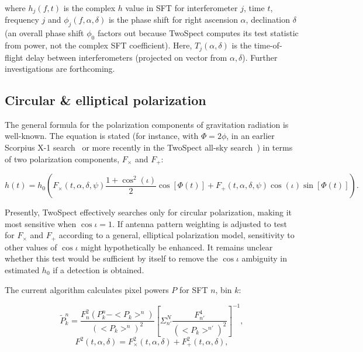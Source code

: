 \noindent where $h_{j}(f,t)$ is the complex $h$ value in SFT for interferometer $j$, time $t$, frequency $j$ and
$\phi_{j}(f,\alpha,\delta)$ is the phase shift for right ascension $\alpha$,
declination $\delta$ 
(an overall phase shift $\phi_{0}$ factors out because
TwoSpect computes its test statistic from power, not the complex SFT coefficient).
Here,
$T_{j}(\alpha,\delta)$ is the time-of-flight delay between interferometers 
(projected on vector from $\alpha,\delta$).
Further investigations are forthcoming.


\subsection{Circular \& elliptical polarization}



The general formula for the polarization components of gravitation radiation is well-known.
The equation is stated (for instance, with $\Phi=2\phi$, in an earlier Scorpius X-1 search~\cite{AbbottScoX12007} or more recently in the TwoSpect all-sky search~\cite{GoetzTwoSpectResults2014}) in terms of two polarization components, $F_\times$ and $F_+$:

\begin{equation}
h(t)=h_{0} \left(F_{\times}(t,\alpha,\delta,\psi)\frac{1+\cos^{2}(\iota)}{2}\cos[\Phi(t)]+
F_{+}(t,\alpha,\delta,\psi)\cos(\iota)\sin[\Phi(t)]\right).
\label{TwoSpect_pol_effect}
\end{equation}

Presently, TwoSpect effectively searches only for circular polarization, making it most sensitive when $\cos \iota = 1$.
If antenna pattern weighting is adjusted to test for $F_\times$ and $F_+$ according to a general, elliptical polarization model, sensitivity to other values of $\cos \iota$ might hypothetically be enhanced.
It remains unclear whether this test would be sufficient by itself to remove the $\cos \iota$ ambiguity in estimated $h_0$ if a detection is obtained.

The current algorithm calculates pixel powers $P$ for SFT $n$, bin $k$:

\begin{equation}
\tilde{P}_{k}^{n}=\frac{F_{n}^{2}(P_{k}^{n}-<P_{k}>^{n})}{(<P_{k}>^{n})^{2}}\left[\Sigma_{n'}^{N}\frac{F_{n'}^{4}}{(<P_{k}>^{n'})^{2}}\right]^{-1},
\label{TwoSpect_pixel_powers}
\end{equation}
\begin{equation}
F^{2}(t,\alpha,\delta)=F_{\times}^{2}(t,\alpha,\delta)+F_{+}^{2}(t,\alpha,\delta),
\label{TwoSpect_pol_powers}
\end{equation}

